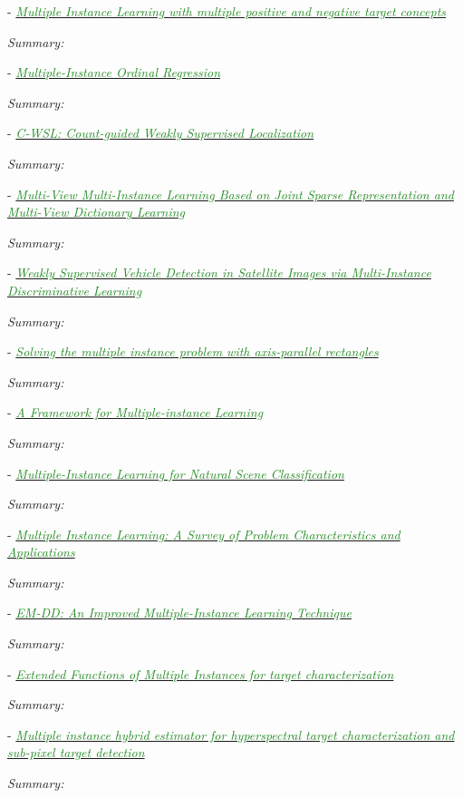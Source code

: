 \documentclass[]{article}
\newcommand{\paperentry}[4]{
            \hangindent=1cm
            \textcolor{red}{\cite{#1}} - \href{run:../References/#3}{\textcolor{ForestGreen}{\textit{#2}}}
            
            \noindent            
            \begin{minipage}[t]{0.1\linewidth}\hfill\end{minipage}
            \begin{minipage}[t]{0.8\linewidth}\textcolor{NavyBlue}{{\textit{Summary:}}}#4\end{minipage}
            \vspace{.25cm}
          }
\begin{document}
		
		\paperentry{Karem2016MILMultiplePositiveAndNegativeConcepts}
		{Multiple Instance Learning with multiple positive and negative target concepts}
		{Multiple_Instance_Learning/Karem2016MILMultiplePositiveAndNegativeConcepts.pdf}
		{}
		
		\paperentry{Xiao2017MIOrdinalRegression}
		{Multiple-Instance Ordinal Regression}
		{Multiple_Instance_Learning/Xiao2017MIOrdinalRegression.pdf}
		{}
		
		\paperentry{Gao2017CountGuidedWeaklySupervisedLocalization}
		{{C-WSL:} Count-guided Weakly Supervised Localization}
		{Multiple_Instance_Learning/Gao2017CountGuidedWeaklySupervisedLocalization.pdf}
		{}
		
		\paperentry{Li2017MultiviewMIL}
		{Multi-View Multi-Instance Learning Based on Joint Sparse Representation and Multi-View Dictionary Learning}
		{Multiple_Instance_Learning/Li2017MultiviewMIL.pdf}
		{}
		
		\paperentry{Cao2016VehicleDetectionMIL}
		{Weakly Supervised Vehicle Detection in Satellite Images via Multi-Instance Discriminative Learning}
		{Multiple_Instance_Learning/Cao2016VehicleDetectionMIL.pdf}
		{}
		
		\paperentry{Dietterich1996AxisParallelRectangles}
		{Solving the multiple instance problem with axis-parallel rectangles}
		{Multiple_Instance_Learning/Dietterich1996AxisParallelRectangles.pdf}
		{}
		
		\paperentry{Maron1998DiverseDensity}
		{A Framework for Multiple-instance Learning}
		{Multiple_Instance_Learning/Maron1998DiverseDensity.pdf}
		{}
		
		\paperentry{Maron1998MILSceneClassification}
		{Multiple-Instance Learning for Natural Scene Classification}
		{Multiple_Instance_Learning/Maron1998MILSceneClassification.pdf}
		{}
		
		\paperentry{Carbonneau2016MILSurvey}
		{Multiple Instance Learning: {A} Survey of Problem Characteristics and Applications}
		{Multiple_Instance_Learning/Carbonneau2016MILSurvey.pdf}
		{}
		
		\paperentry{Zhang2002EMDD}
		{EM-DD: An Improved Multiple-Instance Learning Technique}
		{Multiple_Instance_Learning/Zhang2002EMDD.pdf}
		{}
		
		\paperentry{Zare2015eFUMI}
		{Extended Functions of Multiple Instances for target characterization}
		{Multiple_Instance_Learning/Zare2015eFUMI.pdf}
		{}
		
		\paperentry{Jiao2018MIHE2}
		{Multiple instance hybrid estimator for hyperspectral target characterization and sub-pixel target detection}
		{Multiple_Instance_Learning/Jiao2018MIHE2.pdf}
		{}
		
\end{document}

